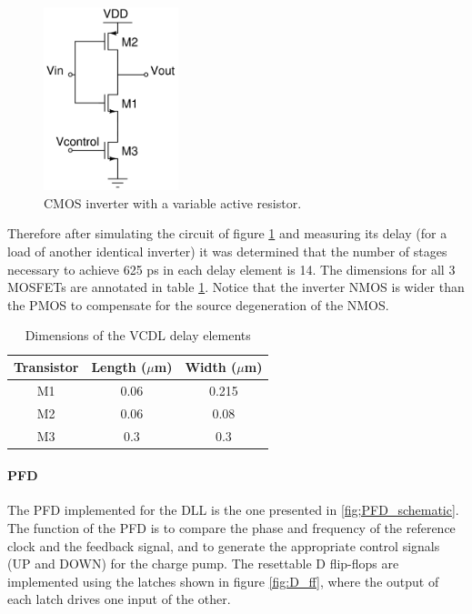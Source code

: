 \begin{figure}[H]
    \centering
    \includegraphics[width=0.35\textwidth]{figures/VCDL_element.png}
    \caption{CMOS inverter with a variable active resistor.}
    \label{fig:VCDL_delay_elements}
\end{figure}

Therefore after simulating the circuit of figure \ref{fig:VCDL_delay_elements} and measuring its delay (for a load of another identical inverter) it was determined that the number of stages necessary to achieve
625 ps in each delay element is 14. The dimensions for all 3 MOSFETs are annotated in table \ref{tab:VCDL_delay_elements_dimensions}. Notice that the inverter NMOS is wider than the PMOS
to compensate for the source degeneration of the NMOS.

\begin{table}[h]
    \centering
    \begin{tabular}{|c|c|c|}
        \hline
        \textbf{Transistor} & \textbf{Length ($\mu$m)} & \textbf{Width ($\mu$m)} \\
        \hline
        M1 & 0.06 & 0.215 \\
        M2 & 0.06 & 0.08 \\
        M3 & 0.3 & 0.3 \\
        \hline
    \end{tabular}
    \caption{Dimensions of the VCDL delay elements}
    \label{tab:VCDL_delay_elements_dimensions}
\end{table}

\paragraph{PFD}
The PFD implemented for the DLL is the one presented in \ref{fig;PFD_schematic}. The function of the PFD is to compare the phase and frequency of the reference clock and the feedback signal, and to generate
the appropriate control signals (UP and DOWN) for the charge pump. The resettable D flip-flops are implemented using the latches shown in figure \ref{fig:D_ff}, where the output of each latch
drives one input of the other.

